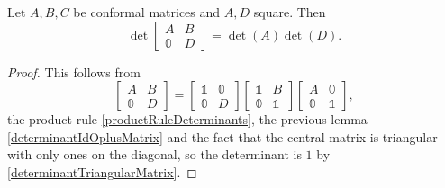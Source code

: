 \begin{lemma} \label{determinantTriangularPartitionedMatrix}
Let $A,B,C$ be conformal matrices and $A,D$ square. Then
\[ \det\begin{bmatrix}A & B \\ \mathbb{0} & D \end{bmatrix} = \det(A)\det(D). \]
\end{lemma}
\begin{proof}
This follows from
\[ \begin{bmatrix}A & B \\ \mathbb{0} & D \end{bmatrix} = \begin{bmatrix}\mathbb{1} & \mathbb{0} \\ \mathbb{0} & D \end{bmatrix} \begin{bmatrix}\mathbb{1} & B \\ \mathbb{0} & \mathbb{1} \end{bmatrix} \begin{bmatrix}A & \mathbb{0} \\ \mathbb{0} & \mathbb{1} \end{bmatrix}, \]
the product rule \ref{productRuleDeterminants}, the previous lemma \ref{determinantIdOplusMatrix} and the fact that the central matrix is triangular with only ones on the diagonal, so the determinant is $1$ by \ref{determinantTriangularMatrix}.
\end{proof}

